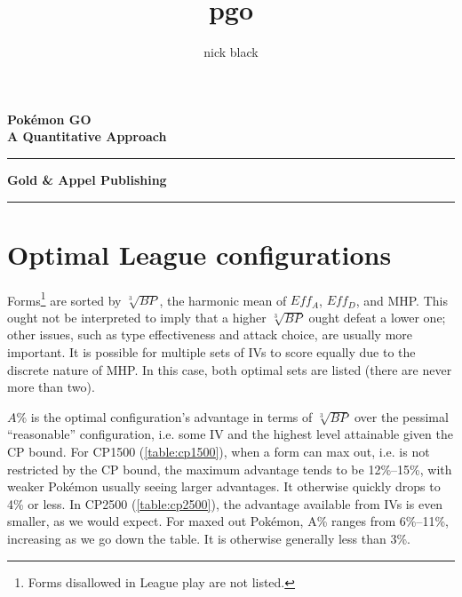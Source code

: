 \documentclass[ebook,10pt,openany,oneside]{memoir}
\title{pgo}
\author{nick black}
\def\LOGO {
  \textbf{
    \Huge Pokémon GO\\
    \Large A Quantitative Approach\\
  }}
\begin{document}
  \pagestyle{empty}
  \begin{center}
  \LOGO
  \vspace{0.5in}
  \end{center}
  \vfill
  \hrule
  \begin{center}
    \textbf{\textsf{Gold \& Appel Publishing}}
  \end{center}
  \hrule
  \clearpage
  \setcounter{page}{1}
  \pagestyle{plain} %

\ifdefined\epub
\else
  \hypertarget{toc}{}%
  \tableofcontents*
  \clearpage
  \hypertarget{lot}{}%
  \listoftables*
  \hypertarget{lof}{}%
  \listoffigures*
  \fi

%
















\appendix
\chapter{Optimal League configurations}
\label{chap:optimal}
Forms\footnote{Forms disallowed in League play are not listed.} are sorted by $\sqrt[3]{BP}$, the harmonic mean of $Eff_A$, $Eff_D$, and MHP\@.
This ought not be interpreted to imply that a higher $\sqrt[3]{BP}$ ought
  defeat a lower one; other issues, such as type effectiveness and attack
  choice, are usually more important.
It is possible for multiple sets of IVs to score equally due to the discrete nature
  of MHP\@.
In this case, both optimal sets are listed (there are never more than two).

$A\%$ is the optimal configuration's advantage in terms of $\sqrt[3]{BP}$
  over the pessimal ``reasonable'' configuration, i.e. some IV
  and the highest level attainable given the CP bound.
For CP1500 (\autoref{table:cp1500}), when a form can max out, i.e. is not restricted by the CP bound,
  the maximum advantage tends to be 12\%--15\%, with weaker Pokémon usually
  seeing larger advantages.
It otherwise quickly drops to 4\% or less.
In CP2500 (\autoref{table:cp2500}), the advantage available from IVs is even smaller, as we would expect.
For maxed out Pokémon, A\% ranges from 6\%--11\%, increasing as we go down the table.
It is otherwise generally less than 3\%.
\end{document}
